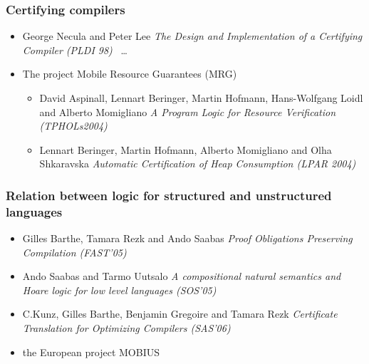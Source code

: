 \documentclass{beamer}
\begin{document}
\begin{frame}[shrink]\frametitle{ Certifying compilers} 
 \begin{itemize}
      \item George Necula and Peter Lee\textit{ The Design and Implementation of a Certifying Compiler (PLDI 98)} \
	\ldots
      \item  The  project Mobile Resource Guarantees (MRG) 
      \begin{itemize}
             \item David Aspinall, Lennart Beringer, Martin Hofmann, Hans-Wolfgang Loidl and Alberto Momigliano 
              \textit{A Program Logic for Resource Verification (TPHOLs2004)}
              \item Lennart Beringer, Martin Hofmann, Alberto Momigliano and Olha Shkaravska
           \textit{Automatic Certification of Heap Consumption (LPAR 2004)} 
        \end{itemize}
 \end{itemize}
\end{frame}

    \begin{frame}[shrink]\frametitle{Relation between logic for structured and unstructured languages}
 \begin{itemize}   
      \item Gilles Barthe, Tamara Rezk  and Ando Saabas \textit{ Proof Obligations Preserving Compilation (FAST'05)}
	\item Ando  Saabas and Tarmo Uutsalo \textit{A compositional natural semantics and Hoare logic for low level languages (SOS'05)}
        \item  C.Kunz, Gilles Barthe, Benjamin Gregoire and Tamara Rezk  \textit{ Certificate Translation for Optimizing Compilers (SAS'06) }
          \item the European project MOBIUS 
 \end{itemize}
\end{frame}
\end{document}
